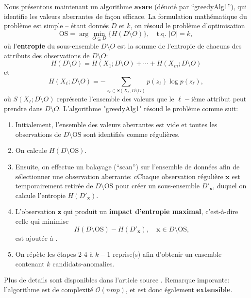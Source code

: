 Nous présentons maintenant un algorithme  \textbf{avare} (d\'enoté par ``greedyAlg1''), qui identifie les valeurs aberrantes de fa\c{c}on efficace. 
\newline\newline La formulation math\'ematique du probl\`eme est simple -- \'etant donn\'es $D$ et $k$, on r\'esoud le probl\`eme d'optimisation $$\text{OS}=\arg\min_{O\subseteq D} \{H(D\setminus O)\}, \quad \text{t.q. }|O|=k,$$
o\`u l'\textbf{entropie} du sous-ensemble $D\setminus O$ est la somme de l'entropie de chacuns des attributs des observations de $D\setminus O$:
$$H(D\setminus O)=H(X_1;D\setminus O)+\cdots + H(X_m;D\setminus O)$$ et $$H(X_{\ell};D\setminus O)=-\!\!\!\!\!\!\!\!\!\!\!\sum_{z_{\ell}\in S(X_{\ell};D\setminus O)}\!\!\!\!\!\!\!\!\!\!\! p(z_{\ell})\log p(z_{\ell}),$$ o\`u $S(X_{\ell};D\setminus O)$ repr\'esente l'ensemble des valeurs que le $\ell-$i\`eme attribut peut prendre dans $D\setminus O$.
\newline\newline L'algorithme "greedyAlg1" r\'esoud le probl\`eme comme suit:
\begin{enumerate}
\item Initialement, l'ensemble des valeurs aberrantes  est vide et toutes les observations de $D\setminus \text{OS}$ sont identifi\'es comme r\'eguli\`eres.
\item On calcule $H(D\setminus \text{OS})$. 

\item Ensuite, on effectue un balayage (``scan'') sur l'ensem\-ble de données afin de sélectionner une observation aberrante: cChaque observation r\'eguli\`ere $\mathbf{x}$ est temporairement retirée de $D\setminus \text{OS}$ pour cr\'eer un sous-ensemble $D'_{\mathbf{x}}$, duquel on calcule l'entropie $H(D'_{\mathbf{x}})$. 
\item L'observation $\mathbf{z}$ qui produit un \textbf{impact d'entropie maximal}, c'est-à-dire celle qui minimise $$H(D\setminus \text{OS})-H(D'_{\mathbf{x}}),\quad \mathbf{x}\in D\setminus \text{OS},$$ est ajout\'ee \`a .

\item On r\'ep\`ete les \'etapes 2-4 \`a $k-1$ reprise(s) afin d'obtenir un ensemble  contenant $k$ candidats-anomalies.
\end{enumerate}

\noindent Plus de details sont disponibles dans l'article source \cite{Article_source}. Remarque imporante: l'algorithme est de complexit\'e $\mathcal{O}(nmp)$, et est donc \'egalement  \textbf{extensible}. 


